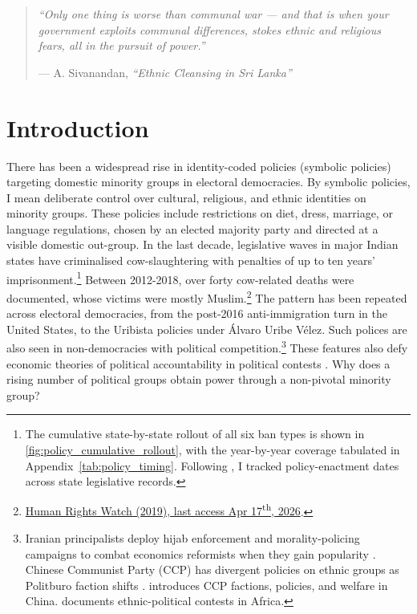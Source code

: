 \documentclass[11pt,twoside]{extarticle}
\begin{document}
\begin{quote}
\textit{``Only one thing is worse than communal war --- and that is when your government exploits communal differences, stokes ethnic and religious fears, all in the pursuit of power.''}

\hfill --- A. Sivanandan, \textit{``Ethnic Cleansing in Sri Lanka''}
\end{quote}

\section{Introduction}


There has been a widespread rise in identity-coded policies (symbolic policies) targeting domestic minority groups in electoral democracies. By symbolic policies, I mean deliberate control over cultural, religious, and ethnic identities on minority groups. These policies include restrictions on diet, dress, marriage, or language regulations, chosen by an elected majority party and directed at a visible domestic out-group. In the last decade, legislative waves in major Indian states have criminalised cow-slaughtering with penalties of up to ten years' imprisonment.\footnote{The cumulative state-by-state rollout of all six ban types is shown in \autoref{fig:policy_cumulative_rollout}, with the year-by-year coverage tabulated in Appendix~\autoref{tab:policy_timing}. Following \citet*{dasguptaNutritionalCostBeef2023}, I tracked policy-enactment dates across state legislative records.} Between 2012-2018, over forty cow-related deaths were documented, whose victims were mostly Muslim.\footnote{\href{https://www.hrw.org/report/2019/02/19/violent-cow-protection-india/vigilante-groups-attack-minorities}{Human Rights Watch (2019), last access Apr 17\textsuperscript{th}, 2026}.} The pattern has been repeated across electoral democracies, from the post-2016 anti-immigration turn in the United States, to the Uribista policies under Álvaro Uribe Vélez. Such polices are also seen in non-democracies with political competition.\footnote{Iranian principalists deploy hijab enforcement and morality-policing campaigns to combat economics reformists when they gain popularity \citep*{bajoghliIranReframedAnxieties2020}. Chinese Communist Party (CCP) has divergent policies on ethnic groups as Politburo faction shifts \citep*{leiboldEthnicPolicyChina2013}. \citet*{francoisFactionsNondemocraciesTheory2023} introduces CCP factions, policies, and welfare in China. \citet*{francoisHowPowerShared2015} documents ethnic-political contests in Africa.} These features also defy economic theories of political accountability in political contests \citep*{barroControlPoliticiansEconomic1973,ferejohnIncumbentPerformanceElectoral1986}. Why does a rising number of political groups obtain power through a non-pivotal minority group?
\end{document}
